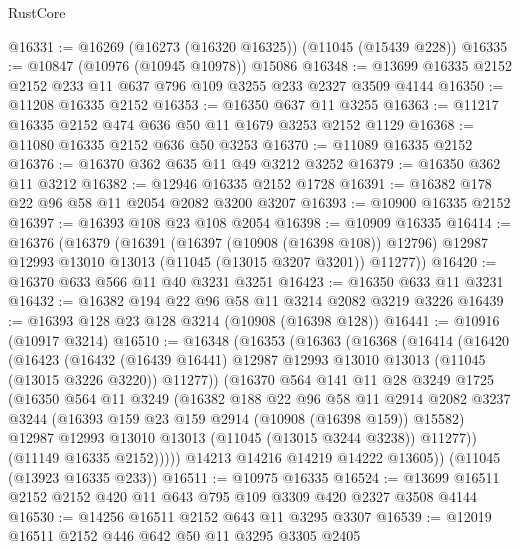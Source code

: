 \begin{lexlean}{RustCore}
\begin{coremodule}
@16331 := @16269 (@16273 (@16320 @16325)) (@11045 (@15439 @228))
@16335 := @10847 (@10976 (@10945 @10978)) @15086
@16348 := @13699 @16335 @2152 @2152 @233 @11 @637 @796 @109 @3255 @233 @2327 @3509 @4144
@16350 := @11208 @16335 @2152
@16353 := @16350 @637 @11 @3255
@16363 := @11217 @16335 @2152 @474 @636 @50 @11 @1679 @3253 @2152 @1129
@16368 := @11080 @16335 @2152 @636 @50 @3253
@16370 := @11089 @16335 @2152
@16376 := @16370 @362 @635 @11 @49 @3212 @3252
@16379 := @16350 @362 @11 @3212
@16382 := @12946 @16335 @2152 @1728
@16391 := @16382 @178 @22 @96 @58 @11 @2054 @2082 @3200 @3207
@16393 := @10900 @16335 @2152
@16397 := @16393 @108 @23 @108 @2054
@16398 := @10909 @16335
@16414 := @16376
    (@16379
      (@16391
        (@16397 (@10908 (@16398 @108)) @12796)
        @12987
        @12993
        @13010
        @13013
        (@11045 (@13015 @3207 @3201))
        @11277))
@16420 := @16370 @633 @566 @11 @40 @3231 @3251
@16423 := @16350 @633 @11 @3231
@16432 := @16382 @194 @22 @96 @58 @11 @3214 @2082 @3219 @3226
@16439 := @16393 @128 @23 @128 @3214 (@10908 (@16398 @128))
@16441 := @10916 (@10917 @3214)
@16510 := @16348
    (@16353
      (@16363
        (@16368
          (@16414
            (@16420
              (@16423
                (@16432
                  (@16439 @16441)
                  @12987
                  @12993
                  @13010
                  @13013
                  (@11045 (@13015 @3226 @3220))
                  @11277))
              (@16370
                @564
                @141
                @11
                @28
                @3249
                @1725
                (@16350
                  @564
                  @11
                  @3249
                  (@16382
                    @188
                    @22
                    @96
                    @58
                    @11
                    @2914
                    @2082
                    @3237
                    @3244
                    (@16393 @159 @23 @159 @2914 (@10908 (@16398 @159)) @15582)
                    @12987
                    @12993
                    @13010
                    @13013
                    (@11045 (@13015 @3244 @3238))
                    @11277))
                (@11149 @16335 @2152)))))
        @14213
        @14216
        @14219
        @14222
        @13605))
    (@11045 (@13923 @16335 @233))
@16511 := @10975 @16335
@16524 := @13699 @16511 @2152 @2152 @420 @11 @643 @795 @109 @3309 @420 @2327 @3508 @4144
@16530 := @14256 @16511 @2152 @643 @11 @3295 @3307
@16539 := @12019 @16511 @2152 @446 @642 @50 @11 @3295 @3305 @2405

\end{coremodule}
\end{lexlean}
